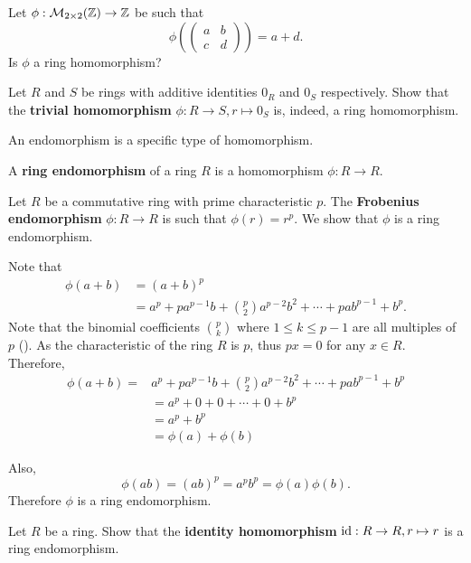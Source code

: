 \begin{exercise}
    Let $\phi: \mathcal{M}_{2\times2}(\mathbb{Z}) \to \mathbb{Z}$ be such that
    \[
        \phi\left(\begin{pmatrix}a&b\\c&d\end{pmatrix}\right) = a+d.
    \]
    Is $\phi$ a ring homomorphism?
\end{exercise}
\begin{exercise}
    Let $R$ and $S$ be rings with additive identities $0_R$ and $0_S$ respectively. Show that the \textbf{trivial homomorphism} $\phi: R \to S, r \mapsto 0_S$ is, indeed, a ring homomorphism.
\end{exercise}

An endomorphism is a specific type of homomorphism.
\begin{definition}
    A \textbf{ring endomorphism} of a ring $R$ is a homomorphism $\phi: R \to R$.
\end{definition}
\begin{example}
    Let $R$ be a commutative ring with prime characteristic $p$. The \textbf{Frobenius endomorphism} $\phi: R \to R$ is such that $\phi(r) = r^p$. We show that $\phi$ is a ring endomorphism.

    Note that
    \begin{align*}
        \phi(a+b) &= (a+b)^p\\
        &= a^p + pa^{p-1}b + {p \choose 2}a^{p-2}b^2 + \cdots + pab^{p-1} + b^p.
    \end{align*}
    Note that the binomial coefficients ${p \choose k}$ where $1 \leq k \leq p-1$ are all multiples of $p$ (). As the characteristic of the ring $R$ is $p$, thus $px = 0$ for any $x \in R$. Therefore,
    \begin{align*}
        \phi(a+b) = &a^p + pa^{p-1}b + {p \choose 2}a^{p-2}b^2 + \cdots + pab^{p-1} + b^p\\
        &= a^p + 0 + 0 + \cdots + 0 + b^p\\
        &= a^p + b^p\\
        &=\phi(a) + \phi(b)
    \end{align*}

    Also,
    \[
        \phi(ab) = (ab)^p = a^pb^p = \phi(a)\phi(b).
    \]
    Therefore $\phi$ is a ring endomorphism.
\end{example}

\begin{exercise}
    Let $R$ be a ring. Show that the \textbf{identity homomorphism} $\mathrm{id}: R \to R, r \mapsto r$ is a ring endomorphism.
\end{exercise}

